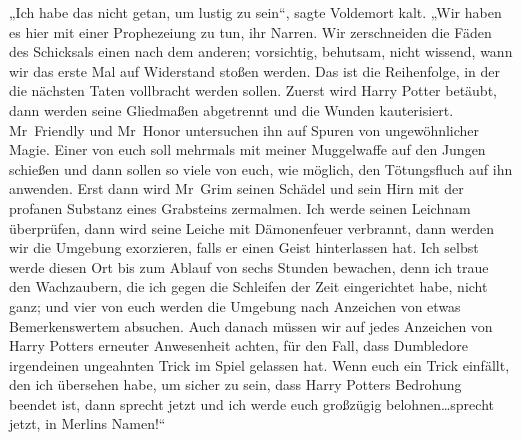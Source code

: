 „Ich habe das nicht getan, um lustig zu sein“, sagte Voldemort kalt.
„Wir haben es hier mit einer Prophezeiung zu tun, ihr Narren. Wir zerschneiden die Fäden des Schicksals einen nach dem anderen; vorsichtig, behutsam, nicht wissend, wann wir das erste Mal auf Widerstand stoßen werden. Das ist die Reihenfolge, in der die nächsten Taten vollbracht werden sollen. Zuerst wird Harry Potter betäubt, dann werden seine Gliedmaßen abgetrennt und die Wunden kauterisiert. Mr~Friendly und Mr~Honor untersuchen ihn auf Spuren von ungewöhnlicher Magie. Einer von euch soll mehrmals mit meiner Muggelwaffe auf den Jungen schießen und dann sollen so viele von euch, wie möglich, den Tötungsfluch auf ihn anwenden. Erst dann wird Mr~Grim seinen Schädel und sein Hirn mit der profanen Substanz eines Grabsteins zermalmen. Ich werde seinen Leichnam überprüfen, dann wird seine Leiche mit Dämonenfeuer verbrannt, dann werden wir die Umgebung exorzieren, falls er einen Geist hinterlassen hat. Ich selbst werde diesen Ort bis zum Ablauf von sechs Stunden bewachen, denn ich traue den Wachzaubern, die ich gegen die Schleifen der Zeit eingerichtet habe, nicht ganz; und vier von euch werden die Umgebung nach Anzeichen von etwas Bemerkenswertem absuchen. Auch danach müssen wir auf jedes Anzeichen von Harry Potters erneuter Anwesenheit achten, für den Fall, dass Dumbledore irgendeinen ungeahnten Trick im Spiel gelassen hat. Wenn euch ein Trick einfällt, den ich übersehen habe, um sicher zu sein, dass Harry Potters Bedrohung beendet ist, dann sprecht jetzt und ich werde euch großzügig belohnen…sprecht jetzt, in Merlins Namen!“


